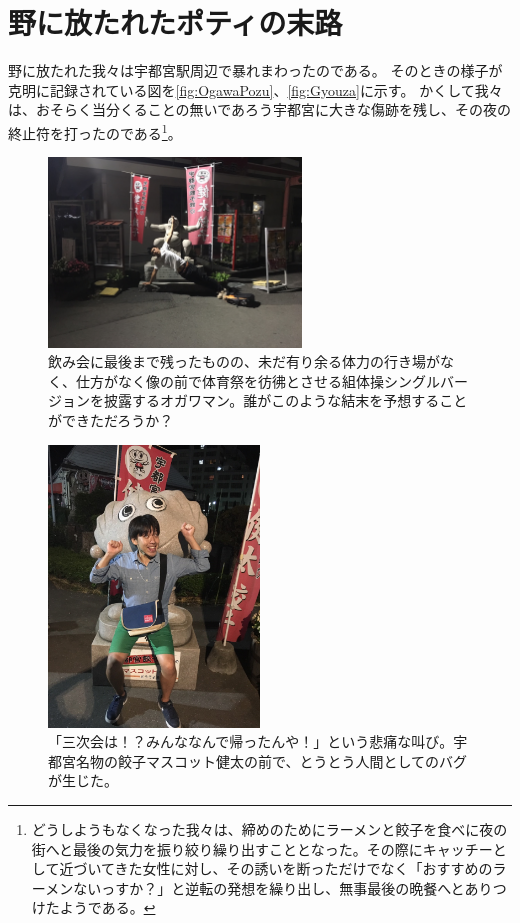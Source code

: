 \section{野に放たれたポティの末路}
野に放たれた我々は宇都宮駅周辺で暴れまわったのである。
そのときの様子が克明に記録されている図を\ref{fig:OgawaPozu}、\ref{fig:Gyouza}に示す。
かくして我々は、おそらく当分くることの無いであろう宇都宮に大きな傷跡を残し、その夜の終止符を打ったのである\footnote{どうしようもなくなった我々は、締めのためにラーメンと餃子を食べに夜の街へと最後の気力を振り絞り繰り出すこととなった。その際にキャッチーとして近づいてきた女性に対し、その誘いを断っただけでなく「おすすめのラーメンないっすか？」と逆転の発想を繰り出し、無事最後の晩餐へとありつけたようである。}。

\begin{figure}[htbp]
  \begin{center}
    \includegraphics[width=0.6\textwidth]{./section/sasakiLIVE/figures/OgawaPozu.jpg}
  \end{center}
  \caption{飲み会に最後まで残ったものの、未だ有り余る体力の行き場がなく、仕方がなく像の前で体育祭を彷彿とさせる組体操シングルバージョンを披露するオガワマン。誰がこのような結末を予想することができただろうか？}
  \label{fig:TakedaYaruki}
\end{figure}

\begin{figure}[htbp]
  \begin{center}
    \includegraphics[width=0.5\textwidth]{./section/sasakiLIVE/figures/Gyouza.jpg}
  \end{center}
  \caption{「三次会は！？みんななんで帰ったんや！」という悲痛な叫び。宇都宮名物の餃子マスコット健太の前で、とうとう人間としてのバグが生じた。}
  \label{fig:TakedaYaruki}
\end{figure}


